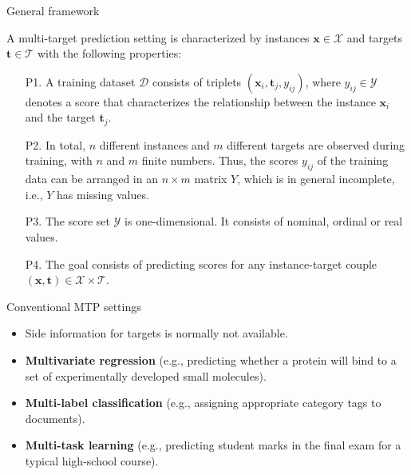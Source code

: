 \documentclass[]{beamer}
\renewcommand{\vec}[1]{\boldsymbol{#1}}
\renewcommand{\emph}[1]{\textbf{\color{putblue}#1}}
\begin{document}
\begin{frame}{General framework}
\begin{definition}
A multi-target prediction setting is characterized by instances $\vec{x} \in \mathcal{X}$ and targets $\vec{t} \in \mathcal{T}$ with the following properties: 
\begin{itemize} 
\item[P1.] A training dataset $\mathcal{D}$ consists of triplets $(\vec{x}_i,\vec{t}_j,y_{ij})$, where $y_{ij} \in \mathcal{Y}$ denotes a score that characterizes the relationship between the instance $\vec{x}_i$ and the target $\vec{t}_j$.  
\item[P2.] In total, $n$ different instances and $m$ different targets are observed during training, with $n$ and $m$ finite numbers. Thus, the scores $y_{ij}$ of the training data can be arranged in an $n \times m$ matrix $Y$, which is in general incomplete, i.e., $Y$ has missing values.
\item[P3.] The score set $\mathcal{Y}$ is one-dimensional. It consists of nominal, ordinal or real values.  
\item[P4.] The goal consists of predicting scores for any instance-target couple $(\vec{x},\vec{t}) \in \mathcal{X} \times \mathcal{T}$.   
\end{itemize}
\end{definition}

\end{frame}


\begin{frame}{Conventional MTP settings}
\begin{itemize}
\item Side information for targets is normally not available. 
\item \emph{Multivariate regression} (e.g., predicting whether a protein will bind to a set of experimentally developed small molecules).
\item \emph{Multi-label classification} (e.g., assigning appropriate category tags to documents).
\item \emph{Multi-task learning} (e.g., predicting student marks in the final exam for a typical high-school course).
\end{itemize}
\end{frame}
\end{document}
